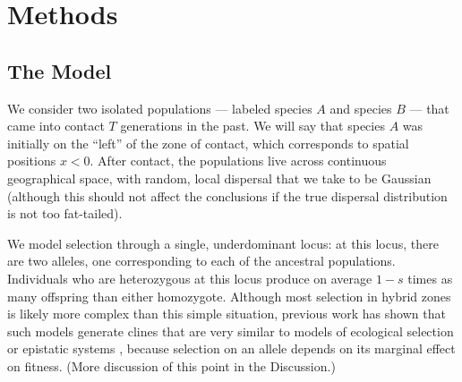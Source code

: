 \documentclass[11pt,letterpaper]{article}
\newcommand{\alisa}[1]{{\em \color{red} #1}}
\begin{document}



\section*{Methods}

\subsection*{The Model}

We consider two isolated populations
--- labeled species $A$ and species $B$ ---   %
that came into contact $T$ generations in the past.  
We will say that species $A$ was initially on the ``left'' of the zone of contact, which corresponds to spatial positions $x<0$.  
After contact, the populations live across continuous geographical space,
with random, local dispersal that we take to be Gaussian
(although this should not affect the conclusions if the true dispersal distribution is not too fat-tailed).

We model selection through a single, underdominant locus:
at this locus, there are two alleles, one corresponding to each of the ancestral populations.
Individuals who are heterozygous at this locus produce on average $1-s$ times as many offspring than either homozygote.
Although most selection in hybrid zones is likely more complex than this simple situation, 
previous work has shown that such models generate clines that are very similar to models of ecological selection or epistatic systems \citep{Kruuk1999,barton2000epistasis}, 
because selection on an allele depends on its marginal effect on fitness.
(More discussion of this point in the Discussion.) 
\end{document}
